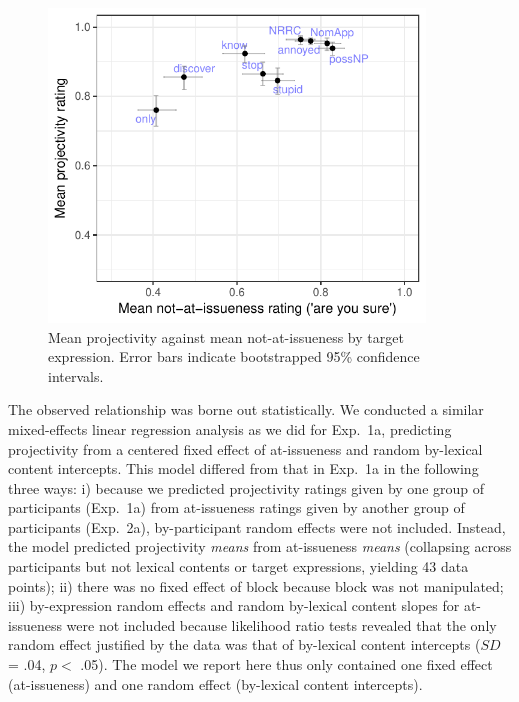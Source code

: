 \documentclass[11pt,fleqn]{article}
\newcommand{\6}{\mbox{$[\hspace*{-.6mm}[$}}
\newcommand{\9}{\mbox{$]\hspace*{-.6mm}]$}}
\begin{document}
\begin{figure}[!h]

\begin{center}
\includegraphics[width=10cm]{../results/exp2a/graphs/ai-proj-bytrigger-labels}
\end{center}

\caption{Mean projectivity against mean not-at-issueness by target expression. Error bars indicate bootstrapped 95\% confidence intervals.}
\label{fig:f-proj-ai-2a}
\end{figure}


The observed relationship was borne out statistically. We conducted a similar mixed-effects linear regression analysis as we did for Exp.~1a, predicting projectivity from a centered fixed effect of at-issueness and random by-lexical content intercepts. This model differed from that in Exp.~1a in the following three ways: i) because we predicted projectivity ratings given by one group of participants (Exp.~1a) from at-issueness ratings given by another group of participants (Exp.~2a), by-participant random effects were not included. Instead, the model predicted projectivity \emph{means}  from  at-issueness \emph{means} (collapsing across participants but not lexical contents or target expressions, yielding 43 data points); ii) there was no fixed effect of block because block was not manipulated; iii) by-expression random effects and random by-lexical content slopes for at-issueness were not included because likelihood ratio tests revealed that the only random effect justified by the data was that of by-lexical content intercepts ($SD$ = .04, $p < $ .05). The model we report here thus only contained one fixed effect (at-issueness) and one random effect (by-lexical content intercepts).
\end{document}
